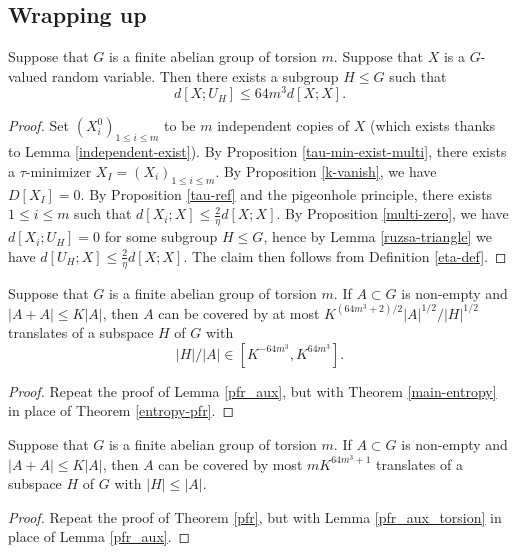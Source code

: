 \subsection{Wrapping up}

\begin{theorem}\label{main-entropy} Suppose that $G$ is a finite abelian group of torsion $m$.  Suppose that $X$ is a $G$-valued random variable. Then there exists a subgroup $H \leq G$ such that \[ d[X;U_H] \leq 64 m^3 d[X;X].\]
\end{theorem}

\begin{proof}  Set $(X^0_i)_{1 \leq i \leq m}$ to be $m$ independent copies of $X$ (which exists thanks to Lemma \ref{independent-exist}).  By Proposition \ref{tau-min-exist-multi}, there exists a $\tau$-minimizer $X_I = (X_i)_{1 \leq i \leq m}$.  By Proposition \ref{k-vanish}, we have $D[X_I]=0$. By Proposition \ref{tau-ref} and the pigeonhole principle, there exists $1 \leq i \leq m$ such that $d[X_i; X] \leq \frac{2}{\eta} d[X;X]$.  By Proposition \ref{multi-zero}, we have $d[X_i;U_H]=0$ for some subgroup $H \leq G$, hence by Lemma \ref{ruzsa-triangle} we have $d[U_H; X] \leq \frac{2}{\eta} d[X;X]$. The claim then follows from Definition \ref{eta-def}.
\end{proof}

\begin{lemma}\label{pfr_aux_torsion}  Suppose that $G$ is a finite abelian group of torsion $m$.  If $A \subset G$ is non-empty and
  $|A+A| \leq K|A|$, then $A$ can be covered by at most $K ^
  {(64m^3+2)/2}|A|^{1/2}/|H|^{1/2}$ translates of a subspace $H$ of $G$ with
  \begin{equation}
    \label{ah}
    |H|/|A| \in [K^{-64m^3}, K^{64m^3}].
  \end{equation}
  \end{lemma}

\begin{proof}  Repeat the proof of Lemma \ref{pfr_aux}, but with Theorem \ref{main-entropy} in place of Theorem \ref{entropy-pfr}.
\end{proof}

\begin{theorem}[PFR]\label{pfr-torsion}  Suppose that $G$ is a finite abelian group of torsion $m$.
  If $A \subset G$ is non-empty and $|A+A| \leq K|A|$, then $A$ can be covered by most $mK^{64m^3+1}$ translates of a subspace $H$ of $G$ with $|H| \leq |A|$.
  \end{theorem}

  \begin{proof} Repeat the proof of Theorem \ref{pfr}, but with Lemma \ref{pfr_aux_torsion} in place of Lemma \ref{pfr_aux}.
  \end{proof}

